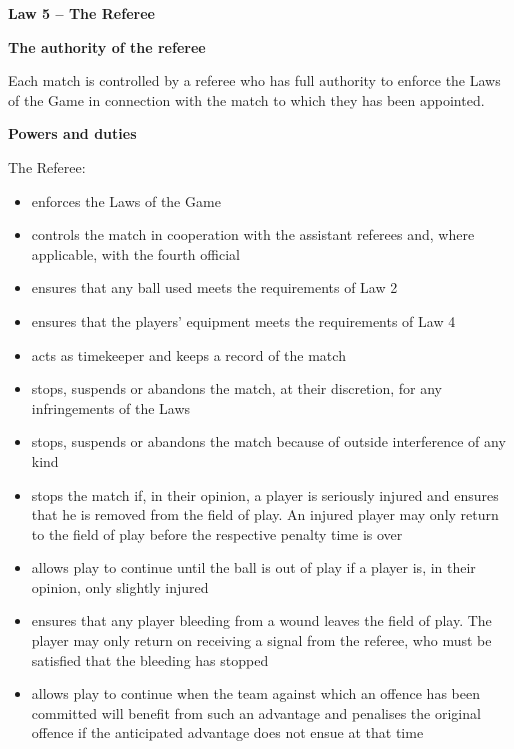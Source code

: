 \clearpage
\sffamily
{\bfseries\color[rgb]{0.4,0.4,0.4}
Law 5 -- The Referee}

\bigskip

{\bfseries The authority of the referee}

\headlinebox

Each match is controlled by a referee who has full authority to enforce the Laws of the Game in connection with the match to which they has been appointed.

\bigskip

{\bfseries Powers and duties}

\headlinebox

The Referee:

\begin{itemize}
\item enforces the Laws of the Game
\item controls the match in cooperation with the assistant referees and, where applicable, with the fourth official
\item ensures that any ball used meets the requirements of Law 2 
\item ensures that the players' equipment meets the requirements of Law 4
\item acts as timekeeper and keeps a record of the match
\item stops, suspends or abandons the match, at their discretion, for any infringements of the Laws
\item stops, suspends or abandons the match because of outside interference of any kind
\item stops the match if, in their opinion, a player is seriously injured and ensures that he is removed from the field of play. An injured player may only return to the field of play  before the respective penalty time is over 
\item allows play to continue until the ball is out of play if a player is, in their opinion, only slightly injured 
\item ensures that any player bleeding from a wound leaves the field of play. The player may only return on receiving a signal from the referee, who must be satisfied that the bleeding has stopped
\item allows play to continue when the team against which an offence has been committed will benefit from such an advantage and penalises the original offence if the anticipated advantage does not ensue at that time

\end{itemize}
